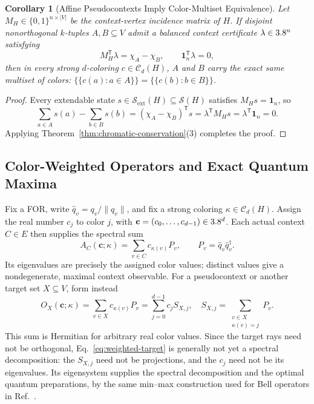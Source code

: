 \documentclass[aps,pra,reprint,superscriptaddress,longbibliography,nofootinbib,floatfix,10pt]{revtex4-2}
\newtheorem{corollary}[theorem]{Corollary}
\theoremstyle{definition}\newtheorem{definition}[theorem]{Definition}
\theoremstyle{remark}\newtheorem{remark}[theorem]{Remark}
\newcommand{\Sc}{\mathcal S}\newcommand{\Cc}{\mathcal C}\newcommand{\Wc}{\mathcal W}
\begin{document}
\begin{corollary}[Affine Pseudocontexts Imply Color-Multiset Equivalence]\label{cor:affine-to-chromatic}
Let $M_H\in\{0,1\}^{n\times |V|}$ be the context-vertex incidence matrix of $H$. If disjoint nonorthogonal $k$-tuples $A,B\subseteq V$ admit a balanced context certificate $\lambda\in3.8^n$ satisfying~\cite{2026-Navara-Svozil-pseudocontexts}
\begin{equation}\label{eq:balanced-certificate}
M_H^{\mathsf T}\lambda = \chi_A - \chi_B,\qquad \mathbf{1}_n^{\mathsf T}\lambda = 0,
\end{equation}
then in every strong $d$-coloring $c\in\Cc_d(H)$, $A$ and $B$ carry the exact same multiset of colors: $\{\!\{c(a):a\in A\}\!\}=\{\!\{c(b):b\in B\}\!\}$.
\end{corollary}
\begin{proof}
Every extendable state $s\in\Sc_{\mathrm{ext}}(H)\subseteq\Sc(H)$ satisfies $M_H s=\mathbf{1}_n$, so
\[
\sum_{a\in A}s(a)-\sum_{b\in B}s(b)=(\chi_A-\chi_B)^{\mathsf T}s=\lambda^{\mathsf T}M_H s=\lambda^{\mathsf T}\mathbf{1}_n=0.
\]
Applying Theorem~\ref{thm:chromatic-conservation}(3) completes the proof.
\end{proof}

\subsection{Color-Weighted Operators and Exact Quantum Maxima}\label{sec:weighted-framework}

Fix a FOR, write $\hat q_v=q_v/\|q_v\|$, and fix a strong coloring $\kappa\in\Cc_d(H)$. Assign the real number $c_j$ to color $j$, with $\mathbf c=(c_0,\ldots,c_{d-1})\in3.8^d$. Each actual context $C\in E$ then supplies the spectral sum
\begin{equation}\label{eq:weighted-context}
A_C(\mathbf c;\kappa)=\sum_{v\in C}c_{\kappa(v)}P_v,
\qquad P_v=\hat q_v\hat q_v^\dagger.
\end{equation}
Its eigenvalues are precisely the assigned color values; distinct values give a nondegenerate, maximal context observable. For a pseudocontext or another target set $X\subseteq V$, form instead
\begin{equation}\label{eq:weighted-target}
O_X(\mathbf c;\kappa)=\sum_{v\in X}c_{\kappa(v)}P_v
=\sum_{j=0}^{d-1}c_j S_{X,j},\quad
S_{X,j}=\sum_{\substack{v\in X\\\kappa(v)=j}}P_v.
\end{equation}
This sum is Hermitian for arbitrary real color values. Since the target rays need not be orthogonal, Eq.~\eqref{eq:weighted-target} is generally not yet a spectral decomposition: the $S_{X,j}$ need not be projections, and the $c_j$ need not be its eigenvalues. Its eigensystem supplies the spectral decomposition and the optimal quantum preparations, by the same min--max construction used for Bell operators in Ref.~\cite{filipp-svo-04-qpoly-prl}.
\end{document}
